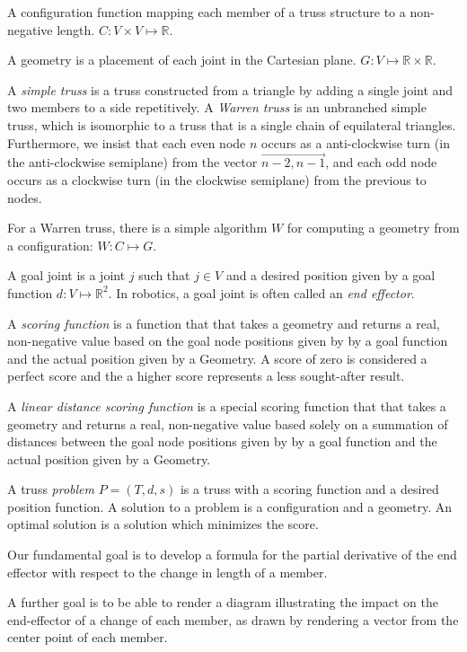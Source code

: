 \documentclass[11pt]{article}
\begin{document}
A configuration function mapping each member of a truss structure to a non-negative length. $C: V \times V \mapsto \mathbb{R}$.

A geometry is a placement of each joint in the Cartesian plane. $G: V \mapsto \mathbb{R} \times \mathbb{R} $.

A {\em simple truss} is a truss constructed from a triangle by adding a single joint and two members to a side repetitively.
A {\em Warren truss} is an unbranched simple truss, which is isomorphic to a truss that is a single chain of equilateral triangles.
Furthermore, we insist that each even node $n$ occurs as a anti-clockwise turn (in the anti-clockwise semiplane) from the vector $\overrightarrow{n-2,n-1}$, and
each odd node occurs as a clockwise turn (in the clockwise semiplane) from the previous to nodes.

For a Warren truss, there is a simple algorithm $W$ for computing a geometry from a configuration: $W : C \mapsto G$.

A goal joint is a joint $j$ such that $j \in V$ and a desired position given by a goal function $d : V \mapsto \mathbb{R}^2$. In robotics,
a goal joint is often called an {\em end effector}.

A {\em scoring function} is a function that that takes a geometry and returns a real, non-negative value based on 
the goal node positions given by by a goal function and the actual position given by a Geometry. A score of zero is considered
 a perfect score and the a higher score represents a less sought-after result.

A {\em linear distance scoring function} is a special scoring function that that takes a geometry and returns a real, non-negative value based solely
on a summation of distances between the goal node positions given by by a goal function and the actual position given by a Geometry.

A truss {\em problem} $P = (T,d,s)$ is a truss with a scoring function and a desired position function.
A solution to a problem is a configuration and a geometry. An optimal solution is a solution which minimizes the score.

Our fundamental goal is to develop a formula for the partial derivative of the end effector
with respect to the change in length of a member.

A further goal is to be able to render a diagram illustrating the impact on the end-effector
of a change of each member, as drawn by rendering a vector from the center point of each member.
\end{document}

